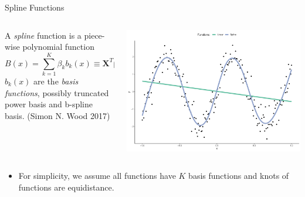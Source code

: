 \documentclass[
  ignorenonframetext,
  aspectratio=169]{beamer}
\providecommand{\tightlist}{%
  \setlength{\itemsep}{0pt}\setlength{\parskip}{0pt}}
\newcommand{\bs}[1]{\boldsymbol{#1}}
\begin{document}
\begin{frame}{Spline Functions}
\protect\hypertarget{spline-functions}{}
\begin{columns}[T]
\begin{column}{0.48\textwidth}
A \emph{spline} function is a piece-wise polynomial function \[
B(x) = \sum\limits_{k = 1}^K \beta_k b_k(x) \equiv  \bs X^T \bs \beta
\] \(b_k(x)\) are the \emph{basis functions}, possibly truncated power
basis and b-spline basis. (Simon N. Wood 2017)
\end{column}

\begin{column}{0.48\textwidth}
\includegraphics{phd_defense_slides_files/figure-beamer/plot1-1.pdf}
\end{column}
\end{columns}

\begin{itemize}
\tightlist
\item
  For simplicity, we assume all functions have \(K\) basis functions and
  knots of functions are equidistance.
\end{itemize}
\end{frame}
\end{document}
